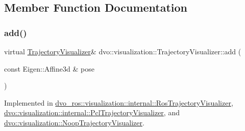 \subsection{Member Function Documentation}
\mbox{\label{classdvo_1_1visualization_1_1_trajectory_visualizer_ac41106ae7e28c019b03f0aa210c6f0c1}} 
\subsubsection{\texorpdfstring{add()}{add()}}
{\footnotesize\ttfamily virtual \mbox{\hyperlink{classdvo_1_1visualization_1_1_trajectory_visualizer}{Trajectory\+Visualizer}}\& dvo\+::visualization\+::\+Trajectory\+Visualizer\+::add (\begin{DoxyParamCaption}\item[{const Eigen\+::\+Affine3d \&}]{pose }\end{DoxyParamCaption})\hspace{0.3cm}{\ttfamily [pure virtual]}}



Implemented in \mbox{\hyperlink{classdvo__ros_1_1visualization_1_1internal_1_1_ros_trajectory_visualizer_acd66991b88e68e9843028cb5cb65c29a}{dvo\+\_\+ros\+::visualization\+::internal\+::\+Ros\+Trajectory\+Visualizer}}, \mbox{\hyperlink{classdvo_1_1visualization_1_1internal_1_1_pcl_trajectory_visualizer_aa174b5910657b2bfed45dfacd429a75a}{dvo\+::visualization\+::internal\+::\+Pcl\+Trajectory\+Visualizer}}, and \mbox{\hyperlink{classdvo_1_1visualization_1_1_noop_trajectory_visualizer_a40e9cfd01744c3efa85afb93237e2030}{dvo\+::visualization\+::\+Noop\+Trajectory\+Visualizer}}.

\mbox{\label{classdvo_1_1visualization_1_1_trajectory_visualizer_a037f387986028db6c8f9c18bc080b9c2}} 
